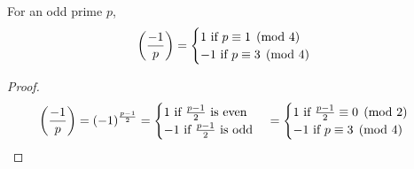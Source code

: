     \begin{corollary}
        For an odd prime $p$, 
        \[
            \left( \frac{-1}{p} \right)  = 
            \begin{cases}
                1 \text{ if } p\equiv 1\pmod{4} \\
                -1 \text{ if } p\equiv 3\pmod{4} 
            \end{cases}
        \]
        \begin{proof}
            \[
            \left( \frac{-1}{p} \right)  = (-1)^{\frac{p-1}{2}} = 
            \begin{cases}
                1 \text{ if }\frac{p-1}{2} \text{ is even} \\
                -1 \text{ if }\frac{p-1}{2} \text{ is odd} 
            \end{cases}
            = 
            \begin{cases}
                1 \text{ if } \frac{p-1}{2}\equiv 0\pmod{2} \\
                -1 \text{ if } p\equiv 3\pmod{4} 
            \end{cases}
        \]
        \end{proof}
    \end{corollary}